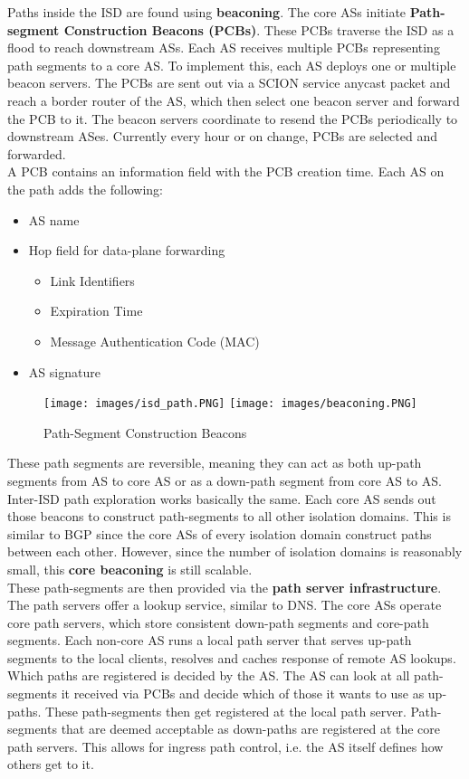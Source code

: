 Paths inside the ISD are found using \textbf{beaconing}. The core ASs initiate \textbf{Path-segment Construction Beacons (PCBs)}. These PCBs traverse the ISD as a flood to reach downstream ASs. Each AS receives multiple PCBs representing path segments to a core AS. To implement this, each AS deploys one or multiple beacon servers. The PCBs are sent out via a SCION service anycast packet and reach a border router of the AS, which then select one beacon server and forward the PCB to it. The beacon servers coordinate to resend the PCBs periodically to downstream ASes. Currently every hour or on change, PCBs are selected and forwarded.\\
A PCB contains an information field with the PCB creation time. Each AS on the path adds the following:
\begin{itemize}
\item AS name
\item Hop field for data-plane forwarding
\begin{itemize}
\item Link Identifiers
\item Expiration Time
\item Message Authentication Code (MAC) 
\end{itemize}
\item AS signature
\end{itemize}
\begin{figure}[h]
\centering
\texttt{[image: images/isd\_path.PNG]}
\texttt{[image: images/beaconing.PNG]}
\label{beaconing}
\caption{Path-Segment Construction Beacons}
\end{figure}
These path segments are reversible, meaning they can act as both up-path segments from AS to core AS or as a down-path segment from core AS to AS.\\
Inter-ISD path exploration works basically the same. Each core AS sends out those beacons to construct path-segments to all other isolation domains. This is similar to BGP since the core ASs of every isolation domain construct paths between each other. However, since the number of isolation domains is reasonably small, this \textbf{core beaconing} is still scalable.\vspace{.3cm}\\

These path-segments are then provided via the \textbf{path server infrastructure}. The path servers offer a lookup service, similar to DNS. The core ASs operate core path servers, which store consistent down-path segments and core-path segments. Each non-core AS runs a local path server that serves up-path segments to the local clients, resolves and caches response of remote AS lookups.\\
Which paths are registered is decided by the AS. The AS can look at all path-segments it received via PCBs and decide which of those it wants to use as up-paths. These path-segments then get registered at the local path server. Path-segments that are deemed acceptable as down-paths are registered at the core path servers. This allows for ingress path control, i.e. the AS itself defines how others get to it.

